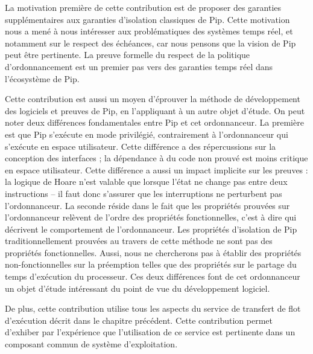 	La motivation première de cette contribution est de proposer des garanties supplémentaires aux garanties d'isolation classiques de Pip. Cette motivation nous a mené à nous intéresser aux problématiques des systèmes temps réel, et notamment sur le respect des échéances, car nous pensons que la vision de Pip peut être pertinente. La preuve formelle du respect de la politique d'ordonnancement est un premier pas vers des garanties temps réel dans l'écosystème de Pip.

	Cette contribution est aussi un moyen d'éprouver la méthode de développement des logiciels et preuves de Pip, en l'appliquant à un autre objet d'étude. On peut noter deux différences fondamentales entre Pip et cet ordonnanceur. La première est que Pip s'exécute en mode privilégié, contrairement à l'ordonnanceur qui s'exécute en espace utilisateur. Cette différence a des répercussions sur la conception des interfaces ; la dépendance à du code non prouvé est moins critique en espace utilisateur. Cette différence a aussi un impact implicite sur les preuves : la logique de Hoare n'est valable que lorsque l'état ne change pas entre deux instructions -- il faut donc s'assurer que les interruptions ne perturbent pas l'ordonnanceur. La seconde réside dans le fait que les propriétés prouvées sur l'ordonnanceur relèvent de l'ordre des propriétés fonctionnelles, c'est à dire qui décrivent le comportement de l'ordonnanceur. Les propriétés d'isolation de Pip traditionnellement prouvées au travers de cette méthode ne sont pas des propriétés fonctionnelles. Aussi, nous ne chercherons pas à établir des propriétés non-fonctionnelles sur la préemption telles que des propriétés sur le partage du temps d'exécution du processeur. Ces deux différences font de cet ordonnanceur un objet d'étude intéressant du point de vue du développement logiciel.

	De plus, cette contribution utilise tous les aspects du service de transfert de flot d'exécution décrit dans le chapitre précédent. Cette contribution permet d'exhiber par l'expérience que l'utilisation de ce service est pertinente dans un composant commun de système d'exploitation.
	

